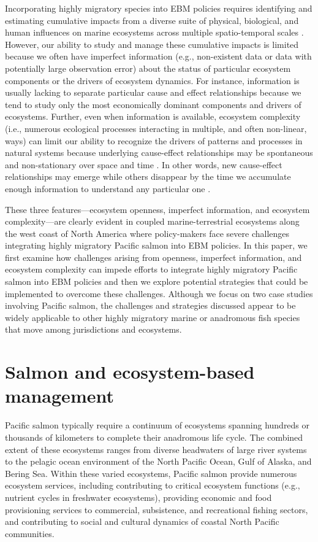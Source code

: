 Incorporating highly migratory species into EBM policies requires identifying
and estimating cumulative impacts from a diverse suite of physical, biological,
and human influences on marine ecosystems across multiple spatio-temporal scales
\citep{Lascelles2014, Halpern2008a}. However, our ability to study and manage
these cumulative impacts is limited because we often have imperfect information
(e.g., non-existent data or data with potentially large observation error) about
the status of particular ecosystem components or the drivers of ecosystem
dynamics. For instance, information is usually lacking to separate particular
cause and effect relationships because we tend to study only the most
economically dominant components and drivers of ecosystems. Further, even when
information is available, ecosystem complexity (i.e., numerous ecological
processes interacting in multiple, and often non-linear, ways) can limit our
ability to recognize the drivers of patterns and processes in natural systems
because underlying cause-effect relationships may be spontaneous and
non-stationary over space and time \citep{Hsieh2005a, Burkett2005a,
Scheffer2001a}. In other words, new cause-effect relationships may emerge while
others disappear by the time we accumulate enough information to understand any
particular one \citep{Myers1998b}.

These three features---ecosystem openness, imperfect information, and
ecosystem complexity---are clearly evident in coupled marine-terrestrial
ecosystems along the west coast of North America where policy-makers face severe
challenges integrating highly migratory Pacific salmon into EBM policies. In
this paper, we first examine how challenges arising from openness, imperfect
information, and ecosystem complexity can impede efforts to integrate highly
migratory Pacific salmon into EBM policies and then we explore potential
strategies that could be implemented to overcome these challenges. Although we
focus on two case studies involving Pacific salmon, the challenges and
strategies discussed appear to be widely applicable to other highly migratory
marine or anadromous fish species that move among jurisdictions and ecosystems.



\section{Salmon and ecosystem-based management}

Pacific salmon typically require a continuum of ecosystems spanning hundreds or
thousands of kilometers to complete their anadromous life cycle. The combined
extent of these ecosystems ranges from diverse headwaters of large river systems
to the pelagic ocean environment of the North Pacific Ocean, Gulf of Alaska, and
Bering Sea. Within these varied ecosystems, Pacific salmon provide numerous
ecosystem services, including contributing to critical ecosystem functions
(e.g., nutrient cycles in freshwater ecosystems), providing economic and food
provisioning services to commercial, subsistence, and recreational fishing
sectors, and contributing to social and cultural dynamics of coastal North
Pacific communities.

